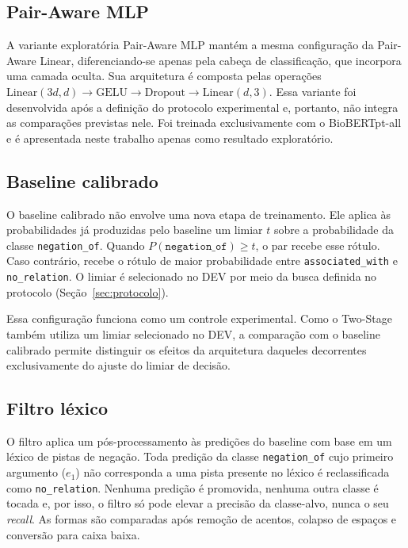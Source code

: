 \subsection{Pair-Aware MLP}
\label{sec:pa_mlp}

A variante exploratória Pair-Aware MLP mantém a mesma configuração da Pair-Aware Linear, diferenciando-se apenas pela cabeça de classificação, que incorpora uma camada oculta. Sua arquitetura é composta pelas operações $\mathrm{Linear}(3d, d) \rightarrow \mathrm{GELU} \rightarrow \mathrm{Dropout} \rightarrow \mathrm{Linear}(d, 3)$. Essa variante foi desenvolvida após a definição do protocolo experimental e, portanto, não integra as comparações previstas nele. Foi treinada exclusivamente com o BioBERTpt-all e é apresentada neste trabalho apenas como resultado exploratório.

\subsection{Baseline calibrado}
\label{sec:calibrado}

O baseline calibrado não envolve uma nova etapa de treinamento. Ele aplica às probabilidades já produzidas pelo baseline um limiar $t$ sobre a probabilidade da classe \texttt{negation\_of}. Quando $P(\texttt{negation\_of}) \geq t$, o par recebe esse rótulo. Caso contrário, recebe o rótulo de maior probabilidade entre \texttt{associated\_with} e \texttt{no\_relation}. O limiar é selecionado no DEV por meio da busca definida no protocolo (Seção~\ref{sec:protocolo}).

Essa configuração funciona como um controle experimental. Como o Two-Stage também utiliza um limiar selecionado no DEV, a comparação com o baseline calibrado permite distinguir os efeitos da arquitetura daqueles decorrentes exclusivamente do ajuste do limiar de decisão.

\subsection{Filtro léxico}
\label{sec:filtro}

O filtro aplica um pós-processamento às predições do baseline com base em um léxico de pistas de negação. Toda predição da classe \texttt{negation\_of} cujo primeiro argumento ($e_1$) não corresponda a uma pista presente no léxico é reclassificada como \texttt{no\_relation}. Nenhuma predição é
promovida, nenhuma outra classe é tocada e, por isso, o filtro só pode elevar a
precisão da classe-alvo, nunca o seu \emph{recall}. As formas são comparadas após
remoção de acentos, colapso de espaços e conversão para caixa baixa.

